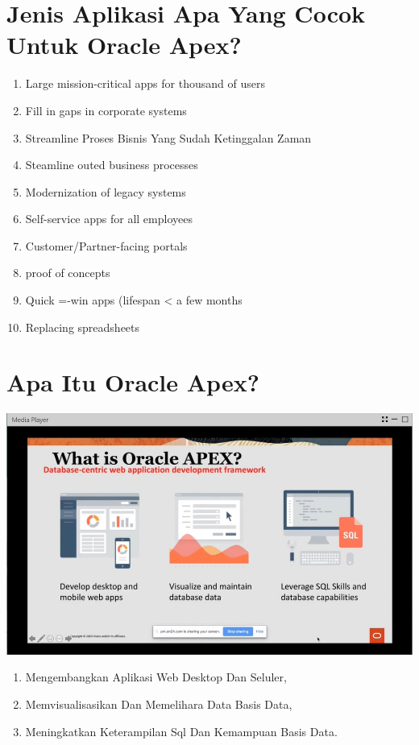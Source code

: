 \documentclass{article}
\begin{document}
\section{Jenis Aplikasi Apa Yang Cocok Untuk Oracle Apex?}
\begin{enumerate}
    \item Large mission-critical apps for thousand of users
    \item Fill in gaps in corporate systems
    \item Streamline Proses Bisnis Yang Sudah Ketinggalan Zaman
    \item Steamline outed business processes
    \item Modernization of legacy systems
    \item Self-service apps for all employees
    \item Customer/Partner-facing portals
    \item proof of concepts
    \item Quick =-win apps (lifespan < a few months
    \item Replacing spreadsheets
\end{enumerate}
\section{Apa Itu Oracle Apex?}
\usepackage{Kerangka kerja pengembangan aplikasi web database-centric.}
\begin{center}
    \includegraphics[width=10cm\textwidth]{figure/1.jpg}
    \end{center}
\begin{enumerate}
    \item Mengembangkan Aplikasi Web Desktop Dan Seluler, 
    \item Memvisualisasikan Dan Memelihara Data Basis Data, 
    \item Meningkatkan Keterampilan Sql Dan Kemampuan Basis Data.

\end{enumerate}
\end{document}
